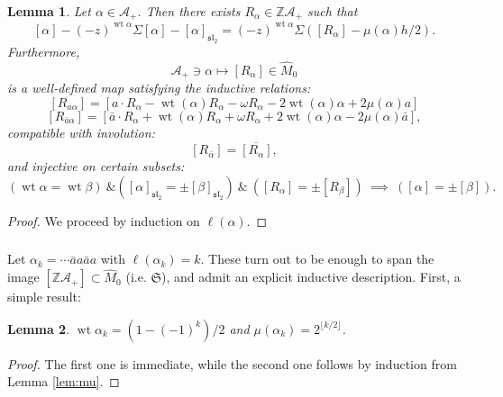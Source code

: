 \documentclass{article}
\def\fsl{\mathfrak{sl}}
\def\fS{\mathfrak{S}}
\def\sA{\mathcal{A}}
\def\ZZ{\mathbb{Z}}
\DeclareMathOperator{\wt}{\mathrm{wt}}
\newtheorem{lem}{Lemma}
\theoremstyle{definition}
\begin{document}
\begin{lem}\label{lem:rest}
        Let $\alpha \in \sA_+$. Then there exists
        $R_\alpha \in \ZZ\sA_+$ such that
        $$ [\alpha] - (-z)^{\wt\alpha}\Sigma[\alpha] - [\alpha]_{\fsl_2}
        = (-z)^{\wt\alpha}\Sigma ([R_\alpha] - \mu(\alpha) h/2).
        $$
        Furthermore, $$ \sA_+\ni\alpha\mapsto [R_\alpha]\in \hat M_0$$
        is a well-defined map 
        satisfying the inductive relations:
        $$
        [R_{a\alpha}] = [a\cdot R_\alpha - \wt(\alpha)R_\alpha - \omega R_\alpha - 2 \wt(\alpha)\alpha
        + 2\mu(\alpha)a]
        $$
        $$
        [R_{\bar a\alpha}] = [\bar a\cdot R_\alpha + \wt(\alpha)R_\alpha + \omega R_\alpha + 2 \wt(\alpha)\alpha
        - 2\mu(\alpha)\bar a],
        $$
        compatible with involution:
        $$ [R_{\bar\alpha}]=\overline{[R_\alpha]}, $$
        and injective on certain subsets:
        $$ 
        \left(\wt\alpha=\wt\beta\right)
        \ \& 
        \left([\alpha]_{\fsl_2}=\pm[\beta]_{\fsl_2}\right)
        \ \&\ 
        \left( [R_\alpha]=\pm[R_\beta]\right)
        \ \implies\ 
        \left([\alpha]=\pm[\beta]\right).$$
\end{lem}
\begin{proof}
        We proceed by induction on $\ell(\alpha)$. 
\end{proof}

\subsubsection{}Let $\alpha_k = \cdots \bar a a\bar a a$ with $\ell(\alpha_k)=k$. 
These turn out to be enough to span the image $[\ZZ\sA_+]\subset\hat M_0$ (i.e. $\fS$),
and admit an explicit inductive description.
First, a simple result:
\begin{lem}\label{lem:wtmu}
        $\wt \alpha_k = (1 - (-1)^k)/2$ and $\mu(\alpha_k)=2^{\lfloor k/2\rfloor}$.
\end{lem}
\begin{proof}
        The first one is immediate, while the second one follows by induction from
        Lemma \ref{lem:mu}.
\end{proof}
\end{document}
